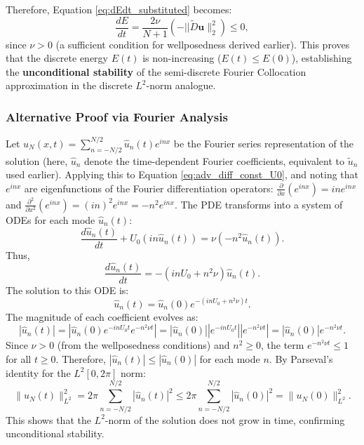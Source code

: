 Therefore, Equation \ref{eq:dEdt_substituted} becomes:
\begin{equation}
\frac{dE}{dt} = \frac{2\nu}{N+1} (-||\tilde{D}\mathbf{u}\|_2^2) \leq 0,
\label{eq:dEdt_final}
\end{equation}
since $\nu > 0$ (a sufficient condition for wellposedness derived earlier).
This proves that the discrete energy $E(t)$ is non-increasing ($E(t) \le E(0)$), establishing the \textbf{unconditional stability} of the semi-discrete Fourier Collocation approximation in the discrete $L^2$-norm analogue.

\subsubsection{Alternative Proof via Fourier Analysis}
Let $u_N(x,t) = \sum_{n=-N/2}^{N/2} \hat{u}_n(t) e^{inx}$ be the Fourier series representation of the solution (here, $\hat{u}_n$ denote the time-dependent Fourier coefficients, equivalent to $\tilde{u}_n$ used earlier).
Applying this to Equation \ref{eq:adv_diff_const_U0}, and noting that $e^{inx}$ are eigenfunctions of the Fourier differentiation operators:
$\frac{\partial}{\partial x} (e^{inx}) = in e^{inx}$ and $\frac{\partial^2}{\partial x^2} (e^{inx}) = (in)^2 e^{inx} = -n^2 e^{inx}$.
The PDE transforms into a system of ODEs for each mode $\hat{u}_n(t)$:
\begin{equation}
\frac{d\hat{u}_n(t)}{dt} + U_0 (in \hat{u}_n(t)) = \nu (-n^2 \hat{u}_n(t)).
\end{equation}
Thus,
\begin{equation}
\frac{d\hat{u}_n(t)}{dt} = -(inU_0 + n^2\nu)\hat{u}_n(t).
\label{eq:modal_ode}
\end{equation}
The solution to this ODE is:
\begin{equation}
\hat{u}_n(t) = \hat{u}_n(0) e^{-(inU_0 + n^2\nu)t}.
\label{eq:modal_solution}
\end{equation}
The magnitude of each coefficient evolves as:
\begin{equation}
|\hat{u}_n(t)| = |\hat{u}_n(0) e^{-inU_0 t} e^{-n^2\nu t}| = |\hat{u}_n(0)| |e^{-inU_0 t}| |e^{-n^2\nu t}| = |\hat{u}_n(0)| e^{-n^2\nu t}.
\label{eq:modal_magnitude}
\end{equation}
Since $\nu > 0$ (from the wellposedness conditions) and $n^2 \ge 0$, the term $e^{-n^2\nu t} \leq 1$ for all $t \ge 0$.
Therefore, $|\hat{u}_n(t)| \leq |\hat{u}_n(0)|$ for each mode $n$.
By Parseval's identity for the $L^2[0, 2\pi]$ norm:
\begin{equation}
\|u_N(t)\|_{L^2}^2 = 2\pi \sum_{n=-N/2}^{N/2} |\hat{u}_n(t)|^2 \leq 2\pi \sum_{n=-N/2}^{N/2} |\hat{u}_n(0)|^2 = \|u_N(0)\|_{L^2}^2.
\label{eq:parseval_stability}
\end{equation}
This shows that the $L^2$-norm of the solution does not grow in time, confirming unconditional stability.


